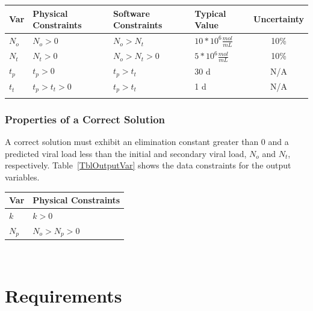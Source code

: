 \documentclass[12pt]{article}
\begin{document}
\begin{center}

\begin{table}[!h]
  \caption{Input Variables} \label{TblInputVar}
  \renewcommand{\arraystretch}{1.2}
\noindent \begin{longtable*}{l l l l c} 
  \toprule
  \textbf{Var} & \textbf{Physical Constraints} & \textbf{Software Constraints} &
                             \textbf{Typical Value} & \textbf{Uncertainty}\\
  \midrule 
  $N_o$ & $N_o > 0$ & $N_o > N_t $ & $10*10^6 \frac{mol}{mL}$ & 
10\%\\
  $N_t$ & $N_t > 0$ & $N_o > N_t > 0$ & $5*10^6 \frac{mol}{mL}$ & 10\%\\
  $t_{p}$ &  $t_{p} > 0$ &  $t_{p}> t_{t} $ & 30 d & N/A\\
  $t_{t}$ &  $t_{p} > t_{t} > 0$ &  $t_{p}> t_{t} $ & 1 d & N/A\\
  \\
  \bottomrule
\end{longtable*}
\end{table}

\end{center}


\subsubsection{Properties of a Correct Solution} \label{sec_CorrectSolution}

\noindent
A correct solution must exhibit an elimination constant greater than 0 and a 
predicted viral load less than the initial and secondary viral load, $N_o$ and 
$N_t$, respectively. 
Table~\ref{TblOutputVar} shows the data constraints for the output variables. 


\begin{table}[!h]
\caption{Output Variables} \label{TblOutputVar}
\renewcommand{\arraystretch}{1.2}
\noindent \begin{longtable*}{l l} 
  \toprule
  \textbf{Var} & \textbf{Physical Constraints} \\
  \midrule 
  $k$ & $k > 0 $ 
  \\ 
  $N_p$ & $N_o > N_p > 0 $ 
   \\
  \bottomrule
\end{longtable*}
\end{table}

~\newpage
\section{Requirements}
\end{document}
